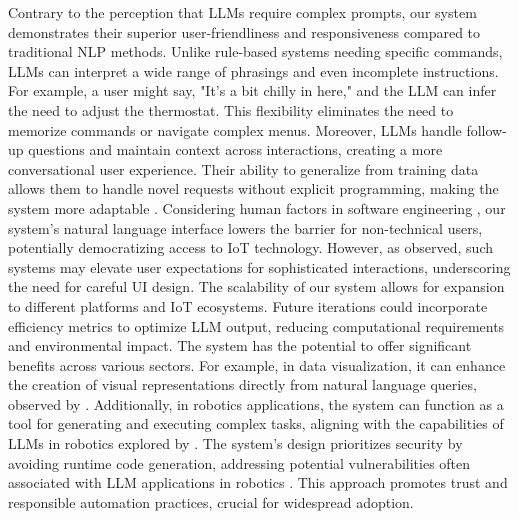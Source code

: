 \documentclass{ieeeaccess}
\begin{document}
Contrary to the perception that LLMs require complex prompts, our system demonstrates their superior user-friendliness and responsiveness compared to traditional NLP methods. Unlike rule-based systems needing specific commands, LLMs can interpret a wide range of phrasings and even incomplete instructions. For example, a user might say, "It's a bit chilly in here," and the LLM can infer the need to adjust the thermostat. This flexibility eliminates the need to memorize commands or navigate complex menus. Moreover, LLMs handle follow-up questions and maintain context across interactions, creating a more conversational user experience. Their ability to generalize from training data allows them to handle novel requests without explicit programming, making the system more adaptable \cite{Kumar2024}. Considering human factors in software engineering \cite{1553657}, our system's natural language interface lowers the barrier for non-technical users, potentially democratizing access to IoT technology. However, as \citet{10.1145/3610977.3634966} observed, such systems may elevate user expectations for sophisticated interactions, underscoring the need for careful UI design. The scalability of our system allows for expansion to different platforms and IoT ecosystems. Future iterations could incorporate efficiency metrics to optimize LLM output, reducing computational requirements and environmental impact. The system has the potential to offer significant benefits across various sectors. For example, in data visualization, it can enhance the creation of visual representations directly from natural language queries, observed by \citet{10121440}. Additionally, in robotics applications, the system can function as a tool for generating and executing complex tasks, aligning with the capabilities of LLMs in robotics explored by \citet{10500490}. The system's design prioritizes security by avoiding runtime code generation, addressing potential vulnerabilities often associated with LLM applications in robotics \cite{10500490}. This approach promotes trust and responsible automation practices, crucial for widespread adoption.


\end{document}

